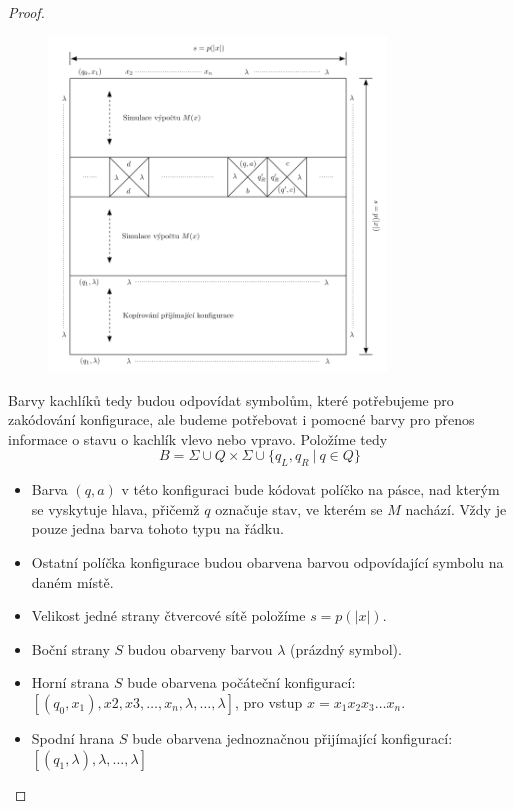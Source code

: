 \documentclass[11pt]{report} %
\numberwithin{equation}{section}
\begin{document}
\begin{proof}
\begin{figure}[H]
	\label{kachl_overview}
	\centering
	\includegraphics[width=0.8\textwidth]{img/kachl_overview.png}
\end{figure}

Barvy kachlíků tedy budou odpovídat symbolům, které potřebujeme pro zakódování konfigurace, ale budeme potřebovat i pomocné barvy pro přenos informace o stavu o kachlík vlevo nebo vpravo. Položíme tedy
$$ B = \Sigma \cup Q \times \Sigma \cup \{q_L, q_R\ |\ q \in Q\}$$

\begin{itemize}
	
	
	\item Barva $(q, a)$ v této konfiguraci bude kódovat políčko na pásce, nad kterým se vyskytuje hlava, přičemž $q$ označuje stav, ve kterém se $M$ nachází. Vždy je pouze jedna barva tohoto typu na řádku.
	\item Ostatní políčka konfigurace budou obarvena barvou odpovídající symbolu na daném místě.
	\item Velikost jedné strany čtvercové sítě položíme $s = p(|x|)$.
	\item Boční strany $S$ budou obarveny barvou $\lambda$ (prázdný symbol).
	\item Horní strana $S$ bude obarvena počáteční konfigurací: $[(q_0, x_1), x2, x3, \dots, x_n, \lambda, \dots,\lambda]$, pro vstup $x = x_1x_2x_3\dots x_n$.
	\item Spodní hrana $S$ bude obarvena jednoznačnou přijímající konfigurací: $[(q_1, \lambda), \lambda, \dots, \lambda]$
\end{itemize}


\end{proof}
\end{document}
